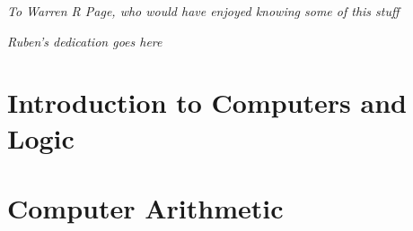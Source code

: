 \documentclass[letterpaper,10pt,extrafontsizesmtwoside,onecolumn,openright,fleqn]{memoir}
\begin{document}
\endgroup

\clearpage

\vspace*{\fill}

\begin{center}
\normalsize\textsf{\emph{To Warren R Page, who would have enjoyed knowing some of this stuff}}\par
\end{center}

\begin{center}
\normalsize\textsf{\emph{Ruben's dedication goes here}}\par
\end{center}

\vspace*{\fill}

\cleardoublepage

\pagestyle{headings}

\setupshorttoc
\tableofcontents
\clearpage
\setupparasubsecs
\setupmaintoc
\tableofcontents
\clearpage
\listoffigures
\clearpage
\listofasides
\clearpage

\clearpage


\mainmatter

\raggedbottom

\part{Introduction to Computers and Logic}











\part{Computer Arithmetic}







\end{document}
